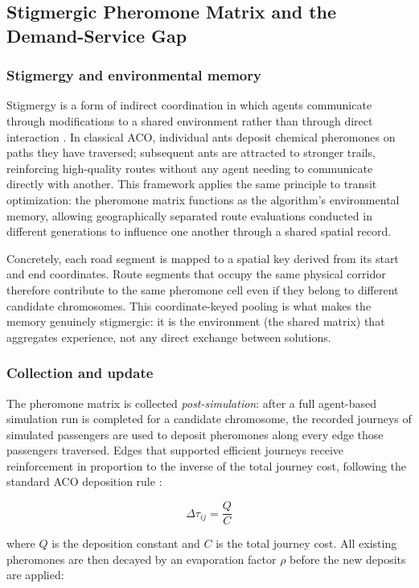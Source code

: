 {{%
\subsection{Stigmergic Pheromone Matrix and the Demand-Service Gap}
\label{sec:pheromone}
\noindent

\subsubsection*{Stigmergy and environmental memory}
Stigmergy is a form of indirect coordination in which agents communicate
through modifications to a shared environment rather than through direct
interaction \citep{Dorigo1996}. In classical ACO, individual ants deposit chemical pheromones on paths they have traversed; subsequent ants are attracted to stronger trails, reinforcing high-quality routes without any agent needing to communicate directly with another. This framework applies the same principle to transit optimization: the pheromone matrix functions as the algorithm's environmental memory, allowing geographically separated route evaluations conducted in different generations to influence one another through a shared
spatial record.

Concretely, each road segment is mapped to a spatial key derived from its start and end coordinates. Route segments that occupy the same physical corridor therefore contribute to the same pheromone cell even if they belong to different candidate chromosomes. This coordinate-keyed pooling is what makes the memory genuinely stigmergic: it is the environment (the shared matrix) that aggregates experience, not any direct exchange between solutions.

\subsubsection*{Collection and update}
The pheromone matrix is collected \emph{post-simulation}: after a full
agent-based simulation run is completed for a candidate chromosome, the recorded journeys of simulated passengers are used to deposit pheromones along every edge those passengers traversed. Edges that supported efficient journeys receive reinforcement in proportion to the inverse of the total journey cost, following the standard ACO deposition rule \citep{Dorigo1996}:

\[
\Delta\tau_{ij} = \frac{Q}{C}
\]

where $Q$ is the deposition constant and $C$ is the total journey cost. All existing pheromones are then decayed by an evaporation factor $\rho$ before the new deposits are applied:

}}
